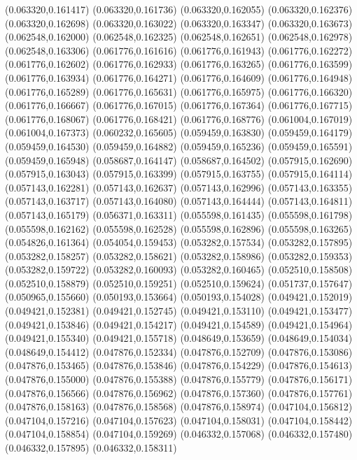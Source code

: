 (0.063320,0.161417)
(0.063320,0.161736)
(0.063320,0.162055)
(0.063320,0.162376)
(0.063320,0.162698)
(0.063320,0.163022)
(0.063320,0.163347)
(0.063320,0.163673)
(0.062548,0.162000)
(0.062548,0.162325)
(0.062548,0.162651)
(0.062548,0.162978)
(0.062548,0.163306)
(0.061776,0.161616)
(0.061776,0.161943)
(0.061776,0.162272)
(0.061776,0.162602)
(0.061776,0.162933)
(0.061776,0.163265)
(0.061776,0.163599)
(0.061776,0.163934)
(0.061776,0.164271)
(0.061776,0.164609)
(0.061776,0.164948)
(0.061776,0.165289)
(0.061776,0.165631)
(0.061776,0.165975)
(0.061776,0.166320)
(0.061776,0.166667)
(0.061776,0.167015)
(0.061776,0.167364)
(0.061776,0.167715)
(0.061776,0.168067)
(0.061776,0.168421)
(0.061776,0.168776)
(0.061004,0.167019)
(0.061004,0.167373)
(0.060232,0.165605)
(0.059459,0.163830)
(0.059459,0.164179)
(0.059459,0.164530)
(0.059459,0.164882)
(0.059459,0.165236)
(0.059459,0.165591)
(0.059459,0.165948)
(0.058687,0.164147)
(0.058687,0.164502)
(0.057915,0.162690)
(0.057915,0.163043)
(0.057915,0.163399)
(0.057915,0.163755)
(0.057915,0.164114)
(0.057143,0.162281)
(0.057143,0.162637)
(0.057143,0.162996)
(0.057143,0.163355)
(0.057143,0.163717)
(0.057143,0.164080)
(0.057143,0.164444)
(0.057143,0.164811)
(0.057143,0.165179)
(0.056371,0.163311)
(0.055598,0.161435)
(0.055598,0.161798)
(0.055598,0.162162)
(0.055598,0.162528)
(0.055598,0.162896)
(0.055598,0.163265)
(0.054826,0.161364)
(0.054054,0.159453)
(0.053282,0.157534)
(0.053282,0.157895)
(0.053282,0.158257)
(0.053282,0.158621)
(0.053282,0.158986)
(0.053282,0.159353)
(0.053282,0.159722)
(0.053282,0.160093)
(0.053282,0.160465)
(0.052510,0.158508)
(0.052510,0.158879)
(0.052510,0.159251)
(0.052510,0.159624)
(0.051737,0.157647)
(0.050965,0.155660)
(0.050193,0.153664)
(0.050193,0.154028)
(0.049421,0.152019)
(0.049421,0.152381)
(0.049421,0.152745)
(0.049421,0.153110)
(0.049421,0.153477)
(0.049421,0.153846)
(0.049421,0.154217)
(0.049421,0.154589)
(0.049421,0.154964)
(0.049421,0.155340)
(0.049421,0.155718)
(0.048649,0.153659)
(0.048649,0.154034)
(0.048649,0.154412)
(0.047876,0.152334)
(0.047876,0.152709)
(0.047876,0.153086)
(0.047876,0.153465)
(0.047876,0.153846)
(0.047876,0.154229)
(0.047876,0.154613)
(0.047876,0.155000)
(0.047876,0.155388)
(0.047876,0.155779)
(0.047876,0.156171)
(0.047876,0.156566)
(0.047876,0.156962)
(0.047876,0.157360)
(0.047876,0.157761)
(0.047876,0.158163)
(0.047876,0.158568)
(0.047876,0.158974)
(0.047104,0.156812)
(0.047104,0.157216)
(0.047104,0.157623)
(0.047104,0.158031)
(0.047104,0.158442)
(0.047104,0.158854)
(0.047104,0.159269)
(0.046332,0.157068)
(0.046332,0.157480)
(0.046332,0.157895)
(0.046332,0.158311)
